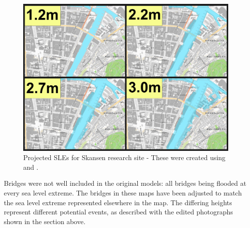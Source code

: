 \begin{figure}[H]
    \centering
    \includegraphics[width=16cm]{fig_sle/nidelva-sle-num.png}
    \caption{Projected SLEs for Skansen research site - These were created using \cite{kartverket_se_2021} and \cite{stormflo_database_stormflo_2021}. }
    \label{fig:sle-nidelva-num}
\end{figure}

 Bridges were not well included in the original models: all bridges being flooded at every sea level extreme. The bridges in these maps have been adjusted to match the sea level extreme represented elsewhere in the map. The differing heights represent different potential events,  as described with the edited photographs shown in the section above. 
